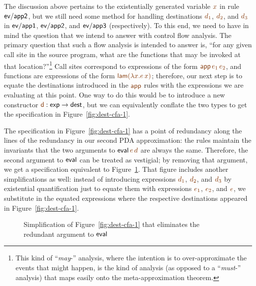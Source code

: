 The discussion above pertains to the existentially generated variable
$\lf{x}$ in rule ${\sf ev/app2}$, but we still need some method for
handling destinations $\lf{d_1}$, $\lf{d_2}$, and $\lf{d_3}$ in ${\sf ev/app1}$,
${\sf ev/app2}$, and ${\sf ev/app3}$ (respectively). To this end, we
need to have in mind the question that we intend to answer with
control flow analysis. The primary question that such a flow analysis
is intended to answer is, ``for any given call site in the source
program, what are the functions that may be invoked at that
location?''\footnote{This kind of ``{\it may}-'' analysis, where the
  intention is to over-approximate the events that might happen, is
  the kind of analysis (as opposed to a ``{\it must}-'' analysis) that
  maps easily onto the meta-approximation theorem.} Call sites
correspond to expressions of the form $\lf{{\sf app}\,e_1\,e_2}$, and
functions are expressions of the form $\lf{{\sf lam}(\lambda x.e\,x)}$;
therefore, our next step is to equate the destinations introduced in
the $\lf{\sf app}$ rules with the expressions we are evaluating at this
point. One way to do this would be to introduce a new constructor
$\lf{\sf d}: {\sf exp} \rightarrow {\sf dest}$, but we can equivalently
conflate the two types to get the specification in
Figure~\ref{fig:dest-cfa-1}. 


The specification in Figure~\ref{fig:dest-cfa-1} has a point of
redundancy along the lines of the redundancy in our second PDA
approximation: the rules maintain the invariants that the two
arguments to ${\sf eval}\,\lf{e}\,\lf{d}$ are always the same. Therefore, the
second argument to ${\sf eval}$ can be treated as vestigial; by
removing that argument, we get a specification equivalent to
Figure~\ref{fig:dest-cfa-2}. That figure includes another
simplifications as well: instead of introducing expressions $\lf{d_1}$,
$\lf{d_2}$, and $\lf{d_3}$ by existential quantification just to equate them
with expressions $\lf{e_1}$, $\lf{e_2}$, and $\lf{e}$, 
we substitute in the equated
expressions where the respective destinations appeared in
Figure~\ref{fig:dest-cfa-1}. 

\begin{figure}[t]
\caption{Simplification of Figure~\ref{fig:dest-cfa-1} that
  eliminates the redundant argument to ${\sf eval}$}
\label{fig:dest-cfa-2}
\end{figure}

